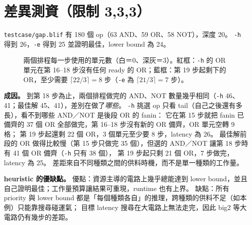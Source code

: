 \documentclass[12pt,a4paper]{article}
\begin{document}
\section{差異測資（限制 3,3,3）}

\texttt{testcase/gap.blif} 有 180 個 op（63 AND、59 OR、58 NOT），深度 20。
\texttt{-h} 得到 26，\texttt{-e} 得到 25 並證明最佳，lower bound 為 24。

\begin{figure}[h]
\centering

\caption{兩個排程每一步使用的單元數（白＝0、深灰＝3）。紅框：\texttt{-h} 的 OR 單元在第 16--18 步沒有任何 ready 的 OR；藍框：第 19 步起剩下的 OR，至少需要 $\lceil 22/3\rceil = 8$ 步（\texttt{-e} 為 $\lceil 21/3\rceil = 7$ 步）。}
\label{fig:gap}
\end{figure}

\textbf{成因。}
到第 18 步為止，兩個排程做完的 AND、NOT 數量幾乎相同（\texttt{-h} 46、41；最佳解 45、41），差別在做了\emph{哪些}。
\texttt{-h} 挑選 op 只看 tail（自己之後還有多長），看不到哪些 AND／NOT 是後段 OR 的 fanin：
它在第 15 步就把 fanin 已備齊的 37 個 OR 全部做完，第 16--18 步沒有新的 OR 備齊，OR 單元空轉 9 格；
第 19 步起還剩 22 個 OR，3 個單元至少要 8 步，latency 為 26。
最佳解前段的 OR 做得比較慢（第 15 步只做完 35 個），但選的 AND／NOT 讓第 18 步時有 41 個 OR 備齊（\texttt{-h} 只有 38 個），
第 19 步起只剩 21 個 OR，7 步做完，latency 為 25。
差距來自不同種類之間的供料時機，而不是單一種類的工作量。

\textbf{heuristic 的優缺點。}
優點：資源主導的電路上幾乎總能達到 lower bound，並且自己證明最佳；工作量預算讓結果可重現，runtime 也有上界。
缺點：所有 priority 與 lower bound 都是「每個種類各自」的推理，跨種類的供料不足（如本例）只能靠搜尋碰運氣；
目標 latency 搜尋在大電路上無法走完，因此 big2 等大電路仍有幾步的差距。
\end{document}
